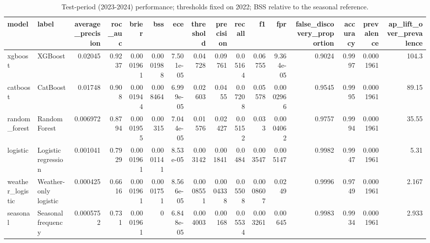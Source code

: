 \begin{table}
\caption{Test-period (2023-2024) performance; thresholds fixed on 2022; BSS relative to the seasonal reference.}
\label{tab:T2_test_metrics}
\begin{tabular}{llrrrrrrrrrrrrrr}
\toprule
model & label & average_precision & roc_auc & brier & bss & ece & threshold & precision & recall & f1 & fpr & false_discovery_proportion & accuracy & prevalence & ap_lift_over_prevalence \\
\midrule
xgboost & XGBoost & 0.02045 & 0.9237 & 0.0001961 & 0.0001988 & 7.501e-05 & 0.04728 & 0.09761 & 0.05164 & 0.06755 & 9.364e-05 & 0.9024 & 0.9997 & 0.0001961 & 104.3 \\
catboost & CatBoost & 0.01748 & 0.908 & 0.0001944 & 0.008464 & 6.999e-05 & 0.02603 & 0.0455 & 0.07208 & 0.05578 & 0.0002966 & 0.9545 & 0.9995 & 0.0001961 & 89.15 \\
random_forest & Random Forest & 0.006972 & 0.8794 & 0.0001955 & 0.00315 & 7.044e-05 & 0.01576 & 0.02427 & 0.05152 & 0.033 & 0.0004062 & 0.9757 & 0.9994 & 0.0001961 & 35.55 \\
logistic & Logistic regression & 0.001041 & 0.7929 & 0.0001961 & 0.0001141 & 8.53e-05 & 0.003142 & 0.001841 & 0.0484 & 0.003547 & 0.005147 & 0.9982 & 0.9947 & 0.0001961 & 5.31 \\
weather_logistic & Weather-only logistic & 0.000425 & 0.6616 & 0.0001961 & 0.0001751 & 8.566e-05 & 0.0008551 & 0.0004338 & 0.05508 & 0.0008607 & 0.0249 & 0.9996 & 0.9749 & 0.0001961 & 2.167 \\
seasonal & Seasonal frequency & 0.0005752 & 0.731 & 0.0001961 & 0 & 6.848e-05 & 0.004003 & 0.00168 & 0.05534 & 0.003261 & 0.00645 & 0.9983 & 0.9934 & 0.0001961 & 2.933 \\
\bottomrule
\end{tabular}
\end{table}
